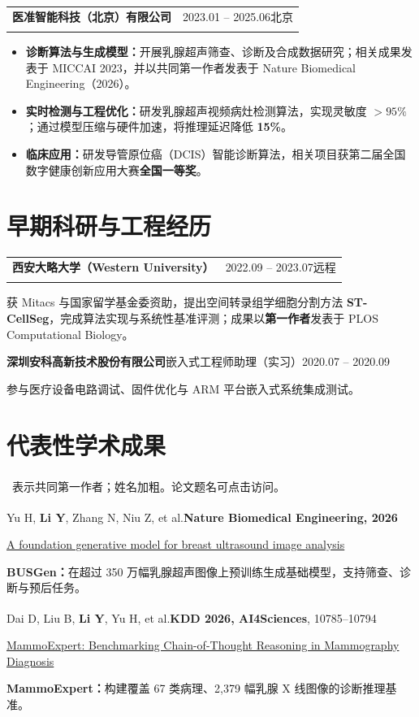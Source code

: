 \documentclass[10pt,a4paper]{article}
\makeatletter
\newcommand{\entry}[3]{%
  \needspace{4\baselineskip}%
  \begin{tabularx}{\linewidth}{@{}>{\raggedright\arraybackslash}X r@{}}%
    \textbf{#1} & {\small\color{muted}#2}\\[-1pt]
    \multicolumn{2}{@{}l@{}}{{\small\color{muted}#3}}
  \end{tabularx}\par\vspace{1pt}}
\newcommand{\pub}[4]{%
  \needspace{4\baselineskip}%
  {\small #1\par\vspace{-1pt}
   \href{#2}{#3}\par\vspace{-1pt}
   {\color{muted}#4}\par}\vspace{4pt}}
\newcommand{\me}{\textbf{Li Y}}
\newcommand{\equal}{\textsuperscript{\dag}}
\makeatother
\begin{document}
\vspace{4pt}
\entry{医准智能科技（北京）有限公司}{2023.01 -- 2025.06\quad 北京}{算法研究实习生}
\begin{itemize}
  \item \textbf{诊断算法与生成模型：}开展乳腺超声筛查、诊断及合成数据研究；相关成果发表于 MICCAI 2023，并以共同第一作者发表于 Nature Biomedical Engineering（2026）。
  \item \textbf{实时检测与工程优化：}研发乳腺超声视频病灶检测算法，实现灵敏度 $>95\%$；通过模型压缩与硬件加速，将推理延迟降低 \textbf{15\%}。
  \item \textbf{临床应用：}研发导管原位癌（DCIS）智能诊断算法，相关项目获第二届全国数字健康创新应用大赛\textbf{全国一等奖}。
\end{itemize}

\section{早期科研与工程经历}
\entry{西安大略大学（Western University）}{2022.09 -- 2023.07\quad 远程}{科研助理\quad\textbar\quad 导师：Pingzhao Hu 教授}
获 Mitacs 与国家留学基金委资助，提出空间转录组学细胞分割方法 \textbf{ST-CellSeg}，完成算法实现与系统性基准评测；成果以\textbf{第一作者}发表于 PLOS Computational Biology。

\vspace{4pt}
{\small\textbf{深圳安科高新技术股份有限公司}\quad 嵌入式工程师助理（实习）\hfill\textcolor{muted}{2020.07 -- 2020.09}\par
参与医疗设备电路调试、固件优化与 ARM 平台嵌入式系统集成测试。}

\newpage
\section{代表性学术成果}
{\footnotesize\color{muted}\equal\ 表示共同第一作者；姓名加粗。论文题名可点击访问。}\par\vspace{2pt}

\pub{Yu H\equal, \me\equal, Zhang N\equal, Niu Z\equal, et al.\quad\textbf{Nature Biomedical Engineering, 2026}}
{https://doi.org/10.1038/s41551-026-01639-1}
{A foundation generative model for breast ultrasound image analysis}
{\textbf{BUSGen：}在超过 350 万幅乳腺超声图像上预训练生成基础模型，支持筛查、诊断与预后任务。}

\pub{Dai D\equal, Liu B\equal, \me\equal, Yu H\equal, et al.\quad\textbf{KDD 2026, AI4Sciences}, 10785--10794}
{https://doi.org/10.1145/3770855.3818933}
{MammoExpert: Benchmarking Chain-of-Thought Reasoning in Mammography Diagnosis}
{\textbf{MammoExpert：}构建覆盖 67 类病理、2,379 幅乳腺 X 线图像的诊断推理基准。}
\end{document}
